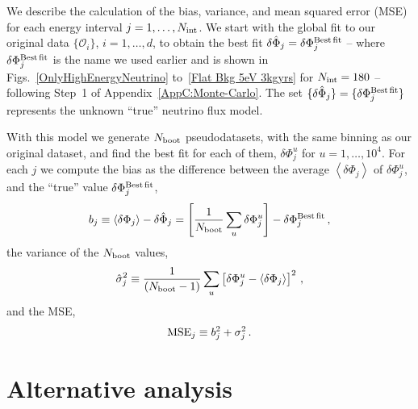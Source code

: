 \documentclass[a4paper,11pt]{article}
\renewcommand\({\left(}
\renewcommand\){\right)}
\renewcommand\[{\left[}
\renewcommand\]{\right]}
\theoremstyle{definition}
\begin{document}
We describe the calculation of the bias, variance, and mean squared error (MSE) for each energy interval $j = 1, \ldots, N_{\rm int}$.
We start with the global fit to our original data  $\{\mathcal{O}_i\}$, $i= 1, \ldots, d$,  to obtain the best fit $ {\delta \hat\Phi}_j = \delta\Phi^{\rm Best\,fit}_j$ -- where $\delta\Phi^{\rm Best\,fit}_j$ is the name we used earlier and is shown in Figs.~\eqref{OnlyHighEnergyNeutrino} to~\eqref{Flat Bkg 5eV 3kgyrs} for $ N_{\rm int}=180$ --
following Step~1 of Appendix~\ref{AppC:Monte-Carlo}. The set $\{\delta\hat{\Phi}_j\}= \{\delta\Phi^{\rm Best\,fit}_j\}$ represents the unknown ``true'' neutrino flux model.

With this model we generate $N_{\rm boot}$ pseudodatasets, with the same binning as our original dataset, and find the best fit for each of them, 
$\delta{\Phi}^u_j$ for $u = 1, \ldots, 10^4$.
For each $j$ we compute the bias as the difference between the average $\left<{\delta\Phi}_j\right>$ of 
$\delta{\Phi}^u_j$, and the ``true'' value $\delta\Phi^{\rm Best\,fit}_j$,
%
\begin{eqnarray}
    b_j \equiv \left<{\delta\Phi}_j\right>-\delta \hat{\Phi}_j = \left[\frac{1}{N_{\rm boot}}\sum_u\delta\Phi_j^u\right]- \delta\Phi^{\rm Best\,fit}_j\,,
\end{eqnarray}
 the variance of the $N_{\rm boot}$ values, 
%  
\begin{eqnarray}
    \hat{\sigma}^2_j \equiv \frac{1}{(N_{\rm boot}-1)}\sum_u\left[\delta\Phi_j^u-\left<{\delta\Phi}_j\right> \right]^2\,,
\end{eqnarray}
and the MSE,
\begin{eqnarray}
    {\rm MSE}_j\equiv b_j^2+\sigma_j^2\,.
\end{eqnarray}

\section{Alternative analysis}
\label{AppD:Method-1}
\end{document}
